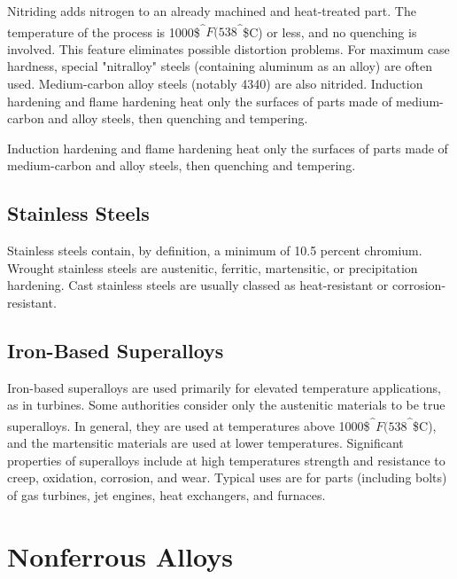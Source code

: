 \documentclass[a4paper,openany,12pt]{book}
\begin{document}
Nitriding adds nitrogen to an already machined and heat-treated part.
The temperature of the process is 1000\$\textsuperscript{\^{}}\(F (538\)\textsuperscript{\^{}}\$C) or
less, and no quenching is involved. This feature eliminates possible
distortion problems. For maximum case hardness, special "nitralloy"
steels (containing aluminum as an alloy) are often used. Medium-carbon
alloy steels (notably 4340) are also nitrided. Induction hardening and
flame hardening heat only the surfaces of parts made of medium-carbon
and alloy steels, then quenching and tempering.

Induction hardening and flame hardening heat only the surfaces of parts
made of medium-carbon and alloy steels, then quenching and tempering.

\subsection{Stainless Steels}
\label{stainless-steels}
Stainless steels contain, by definition, a minimum of 10.5 percent
chromium. Wrought stainless steels are austenitic, ferritic,
martensitic, or precipitation hardening. Cast stainless steels are
usually classed as heat-resistant or corrosion-resistant.

\subsection{Iron-Based Superalloys}
\label{iron-based-superalloys}
Iron-based superalloys are used primarily for elevated temperature
applications, as in turbines. Some authorities consider only the
austenitic materials to be true superalloys. In general, they are used
at temperatures above 1000\$\textsuperscript{\^{}}\(F (538\)\textsuperscript{\^{}}\$C), and the
martensitic materials are used at lower temperatures. Significant
properties of superalloys include at high temperatures strength and
resistance to creep, oxidation, corrosion, and wear. Typical uses are
for parts (including bolts) of gas turbines, jet engines, heat
exchangers, and furnaces.

\section{Nonferrous Alloys}
\label{nonferrous-alloys}
\end{document}
